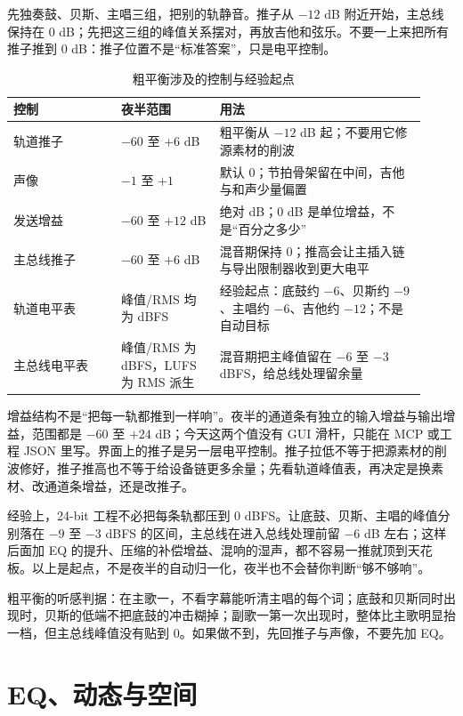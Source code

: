 先独奏鼓、贝斯、主唱三组，把别的轨静音。推子从 $-12$ dB 附近开始，主总线保持在 $0$ dB；先把这三组的峰值关系摆对，再放吉他和弦乐。不要一上来把所有推子推到 $0$ dB：推子位置不是“标准答案”，只是电平控制。

\begin{table}[htbp]
\centering
\small
\begin{tabular}{@{}p{0.24\linewidth}p{0.22\linewidth}p{0.46\linewidth}@{}}
\hline
控制 & 夜半范围 & 用法 \\
\hline
轨道推子 & $-60$ 至 $+6$ dB & 粗平衡从 $-12$ dB 起；不要用它修源素材的削波 \\
声像 & $-1$ 至 $+1$ & 默认 $0$；节拍骨架留在中间，吉他与和声少量偏置 \\
发送增益 & $-60$ 至 $+12$ dB & 绝对 dB；$0$ dB 是单位增益，不是“百分之多少” \\
主总线推子 & $-60$ 至 $+6$ dB & 混音期保持 $0$；推高会让主插入链与导出限制器收到更大电平 \\
轨道电平表 & 峰值/RMS 均为 dBFS & 经验起点：底鼓约 $-6$、贝斯约 $-9$、主唱约 $-6$、吉他约 $-12$；不是自动目标 \\
主总线电平表 & 峰值/RMS 为 dBFS，LUFS 为 RMS 派生 & 混音期把主峰值留在 $-6$ 至 $-3$ dBFS，给总线处理留余量 \\
\hline
\end{tabular}
\caption{粗平衡涉及的控制与经验起点}
\label{tab:walk-controls}
\end{table}

增益结构不是“把每一轨都推到一样响”。夜半的通道条有独立的输入增益与输出增益，范围都是 $-60$ 至 $+24$ dB；今天这两个值没有 GUI 滑杆，只能在 MCP 或工程 JSON 里写。界面上的推子是另一层电平控制。推子拉低不等于把源素材的削波修好，推子推高也不等于给设备链更多余量；先看轨道峰值表，再决定是换素材、改通道条增益，还是改推子。

经验上，24-bit 工程不必把每条轨都压到 $0$ dBFS。让底鼓、贝斯、主唱的峰值分别落在 $-9$ 至 $-3$ dBFS 的区间，主总线在进入总线处理前留 $-6$ dB 左右；这样后面加 EQ 的提升、压缩的补偿增益、混响的湿声，都不容易一推就顶到天花板。以上是起点，不是夜半的自动归一化，夜半也不会替你判断“够不够响”。

粗平衡的听感判据：在主歌一，不看字幕能听清主唱的每个词；底鼓和贝斯同时出现时，贝斯的低端不把底鼓的冲击糊掉；副歌一第一次出现时，整体比主歌明显抬一档，但主总线峰值没有贴到 $0$。如果做不到，先回推子与声像，不要先加 EQ。


\section{EQ、动态与空间}

